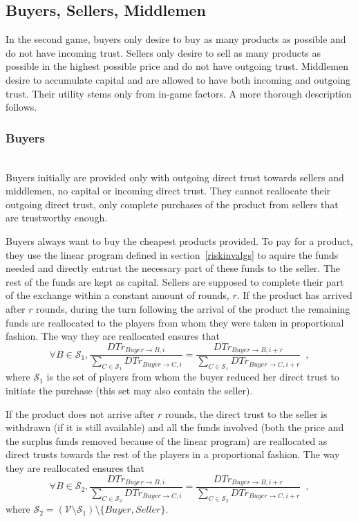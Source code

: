 \subsection{Buyers, Sellers, Middlemen}
  In the second game, buyers only desire to buy as many products as possible and do not have incoming trust. Sellers only
  desire to sell as many products as possible in the highest possible price and do not have outgoing trust. Middlemen desire
  to accumulate capital and are allowed to have both incoming and outgoing trust. Their utility stems only from in-game
  factors. A more thorough description follows.

  \subsubsection{Buyers} \ \\

    Buyers initially are provided only with outgoing direct trust towards sellers and middlemen, no capital or incoming direct
    trust. They cannot reallocate their outgoing direct trust, only complete purchases of the product from sellers that are
    trustworthy enough.
    
    Buyers always want to buy the cheapest products provided. To pay for a product, they use the linear program defined in
    section~\ref{riskinvalgs} to aquire the funds needed and directly entrust the necessary part of these funds to the seller.
    The rest of the funds are kept as capital. Sellers are supposed to complete their part of the exchange within a constant
    amount of rounds, $r$. If the product has arrived after $r$ rounds, during the turn following the arrival of the product
    the remaining funds are reallocated to the players from whom they were taken in proportional fashion. The way they are
    reallocated ensures that
    \begin{equation*}
      \forall B \in \mathcal{S}_1, \frac{DTr_{Buyer \rightarrow B, i}}{\sum\limits_{C \in \mathcal{S}_1}DTr_{Buyer \rightarrow
      C, i}} = \frac{DTr_{Buyer \rightarrow B, i + r}}{\sum\limits_{C \in \mathcal{S}_1}DTr_{Buyer \rightarrow C, i + r}}
      \enspace,
    \end{equation*}
    where $\mathcal{S}_1$ is the set of players from whom the buyer reduced her direct trust to initiate the purchase (this
    set may also contain the seller).

    If the product does not arrive after $r$ rounds, the direct trust to the seller is withdrawn (if it is still available)
    and all the funds involved (both the price and the surplus funds removed because of the linear program) are reallocated as
    direct trusts towards the rest of the players in a proportional fashion. The way they are reallocated ensures that
    \begin{equation*}
      \forall B \in \mathcal{S}_2, \frac{DTr_{Buyer \rightarrow B, i}}{\sum\limits_{C \in \mathcal{S}_2}DTr_{Buyer \rightarrow
      C, i}} = \frac{DTr_{Buyer \rightarrow B, i + r}}{\sum\limits_{C \in \mathcal{S}_2}DTr_{Buyer \rightarrow C, i + r}}
      \enspace,
    \end{equation*}
    where $\mathcal{S}_2 = \left(\mathcal{V} \setminus \mathcal{S}_1\right) \setminus{\{Buyer, Seller\}}$.

